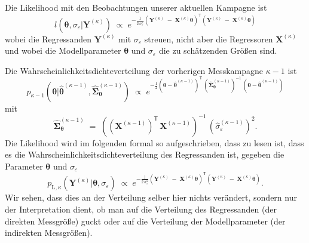Die Likelihood mit den Beobachtungen unserer aktuellen Kampagne ist
\begin{equation}
l(\boldsymbol{\theta}, \sigma_{\varepsilon} | \mathbf{Y}^{(\kappa)}) \; \propto \;
e^{-\frac{1}{2 \, \sigma_{\varepsilon}^2}
	\left(\mathbf{Y}^{(\kappa)} \; - \;  \mathbf{X}^{(\kappa)} \boldsymbol{\theta} \right)^\mathsf{T}
	\left(\mathbf{Y}^{(\kappa)} \; - \;  \mathbf{X}^{(\kappa)} \boldsymbol{\theta} \right)}
\end{equation}
wobei die Regressanden $\mathbf{Y}^{(\kappa)}$ mit $\sigma_{\varepsilon}$ streuen, nicht
aber die Regressoren $\mathbf{X}^{(\kappa)}$ und wobei die Modellparameter
$\boldsymbol{\theta}$ und $\sigma_{\varepsilon}$ die zu schätzenden Größen sind.

Die Wahrscheinlichkeitsdichteverteilung der vorherigen Messkampagne $\kappa-1$
ist
\begin{equation}
p_{\kappa-1}(\boldsymbol{\theta} | \boldsymbol{\hat \theta}^{(\kappa-1)}, 
\boldsymbol{\hat \Sigma}^{(\kappa-1)}_{\boldsymbol{\theta}})
\; \propto \; e^{-\frac{1}{2} 
	\left(\boldsymbol{\theta} - \boldsymbol{\hat \theta}^{(\kappa-1)} \right)^\mathsf{T} \,
	\left(\boldsymbol{\hat \Sigma}_{\boldsymbol{\theta}}^{(\kappa-1)}\right)^{-1} \, \left(\boldsymbol{\theta} - \boldsymbol{\hat \theta}^{(\kappa-1)} \right)}
\label{priorRegression}
\end{equation}
mit
$$
\boldsymbol{\hat \Sigma}_{\boldsymbol{\theta}}^{(\kappa-1)} \; = \; 
\left( \left(\mathbf{X}^{(\kappa-1)}\right)^\mathsf{T} \, \mathbf{X}^{(\kappa-1)} \right)^{-1} 
\, \left(\hat \sigma_{\varepsilon}^{(\kappa-1)}\right)^2 .
$$
Die Likelihood wird im folgenden formal so aufgeschrieben, dass zu lesen ist, dass es die
Wahrscheinlichkeitsdichteverteilung des Regressanden ist, gegeben die Parameter
$\boldsymbol{\theta}$ und $\sigma_{\varepsilon}$
\begin{equation}
p_{\mathrm{L},\kappa} (\mathbf{Y}^{(\kappa)} | \boldsymbol{\theta}, \sigma_{\varepsilon}) \; \propto \;
e^{-\frac{1}{2 \, \sigma_{\varepsilon}^2}
	\left(\mathbf{Y}^{(\kappa)} \; - \;  \mathbf{X}^{(\kappa)} \boldsymbol{\theta} \right)^\mathsf{T}
	\left(\mathbf{Y}^{(\kappa)} \; - \;  \mathbf{X}^{(\kappa)} \boldsymbol{\theta} \right)} .
\end{equation}
Wir sehen, dass dies an der Verteilung selber hier nichts verändert, sondern nur der
Interpretation dient, ob man auf die Verteilung des Regressanden (der direkten
Messgröße) guckt oder auf die Verteilung der Modellparameter (der indirekten Messgrößen).

